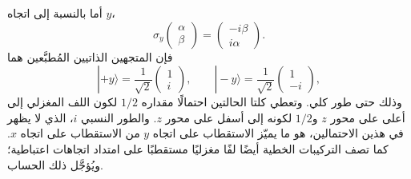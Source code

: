 أما بالنسبة إلى اتجاه \(y\)،
\begin{equation}
\sigma_y
\begin{pmatrix}
\alpha\\
\beta
\end{pmatrix}
=
\begin{pmatrix}
-i\beta\\
i\alpha
\end{pmatrix}.
\end{equation}
فإن المتجهين الذاتيين المُطبَّعين هما
\begin{equation}
|+y\rangle
=
\frac{1}{\sqrt2}
\begin{pmatrix}
1\\
i
\end{pmatrix},
\qquad
|-y\rangle
=
\frac{1}{\sqrt2}
\begin{pmatrix}
1\\
-i
\end{pmatrix},
\end{equation}
وذلك حتى طور كلي. وتعطي كلتا الحالتين احتمالًا مقداره \(1/2\) لكون اللف المغزلي إلى أعلى على محور \(z\) و\(1/2\) لكونه إلى أسفل على محور \(z\). والطور النسبي \(i\)، الذي لا يظهر في هذين الاحتمالين، هو ما يميّز الاستقطاب على اتجاه \(y\) من الاستقطاب على اتجاه \(x\). كما تصف التركيبات الخطية أيضًا لفًا مغزليًا مستقطبًا على امتداد اتجاهات اعتباطية؛ ويُؤجَّل ذلك الحساب.

\begin{classroomqa}
\end{classroomqa}

